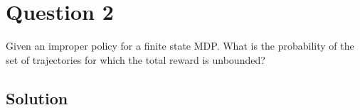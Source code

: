 \section*{Question 2}

Given an improper policy for a finite state MDP.\@
What is the probability of the set of trajectories for which the total reward is unbounded?

\subsection*{Solution}
